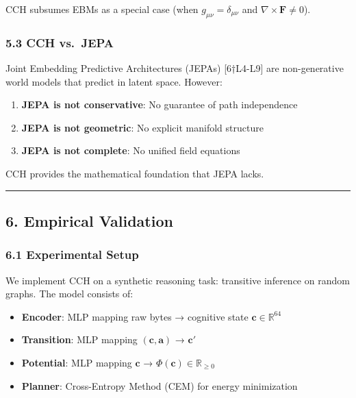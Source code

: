 \documentclass[
  11pt,
  a4paper,
]{article}
\providecommand{\tightlist}{%
  \setlength{\itemsep}{0pt}\setlength{\parskip}{0pt}}
\begin{document}
CCH subsumes EBMs as a special case (when
\(g_{\mu\nu} = \delta_{\mu\nu}\) and
\(\nabla \times \mathbf{F} \neq 0\)).

\subsubsection{5.3 CCH vs.~JEPA}\label{cch-vs.-jepa}

Joint Embedding Predictive Architectures (JEPAs) {[}6†L4-L9{]} are
non-generative world models that predict in latent space. However:

\begin{enumerate}
\def\labelenumi{\arabic{enumi}.}
\tightlist
\item
  \textbf{JEPA is not conservative}: No guarantee of path independence
\item
  \textbf{JEPA is not geometric}: No explicit manifold structure
\item
  \textbf{JEPA is not complete}: No unified field equations
\end{enumerate}

CCH provides the mathematical foundation that JEPA lacks.

\begin{center}\rule{0.5\linewidth}{0.5pt}\end{center}

\subsection{6. Empirical Validation}\label{empirical-validation}

\subsubsection{6.1 Experimental Setup}\label{experimental-setup}

We implement CCH on a synthetic reasoning task: transitive inference on
random graphs. The model consists of:

\begin{itemize}
\tightlist
\item
  \textbf{Encoder}: MLP mapping raw bytes → cognitive state
  \(\mathbf{c} \in \mathbb{R}^{64}\)
\item
  \textbf{Transition}: MLP mapping \((\mathbf{c}, \mathbf{a})\) →
  \(\mathbf{c}'\)
\item
  \textbf{Potential}: MLP mapping \(\mathbf{c}\) →
  \(\Phi(\mathbf{c}) \in \mathbb{R}_{\geq 0}\)
\item
  \textbf{Planner}: Cross-Entropy Method (CEM) for energy minimization
\end{itemize}
\end{document}
